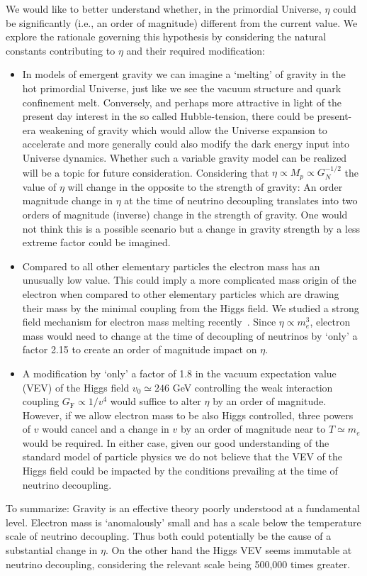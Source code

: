 We would like to better understand whether, in the primordial Universe, $\eta$ could be significantly (i.e., an order
of magnitude) different from the current value. We explore the rationale governing this
hypothesis by considering the natural constants  contributing to $\eta$ and their required
modification:
\begin{itemize}
\item
In models of emergent gravity we can imagine a `melting' of gravity in the hot primordial
Universe, just like we see the vacuum structure and quark confinement melt. Conversely, and
perhaps more attractive in light of the present day interest in the so called Hubble-tension, there could be
present-era weakening of gravity which would allow the Universe expansion to accelerate and more
generally could also modify the dark energy input into Universe dynamics. Whether such a
variable gravity model can be realized will be a topic for future consideration. Considering
that  $\eta\propto M_p\propto G_N^{-1/2}$ the value of $\eta$ will change in the opposite to the
strength of gravity: An order magnitude change in $\eta$ at the time of neutrino decoupling
translates into two orders of magnitude (inverse) change in the strength of gravity. One would
not think this is a possible scenario but a change in gravity strength by a less extreme factor
could be imagined.
\item
Compared to all other elementary particles the electron mass has an unusually low value. This
could imply a more complicated mass origin of the electron when compared to other elementary
particles which are drawing their mass by the minimal coupling from the Higgs field.  We studied
  a strong field mechanism for electron mass melting recently~\cite{Evans:2019zyk}. Since
$\eta\propto m_e^3$, electron mass would need to change at the time of decoupling of neutrinos by
`only' a factor 2.15 to create an order of magnitude impact on $\eta$.
\item
A modification by `only' a factor of 1.8  in the vacuum  expectation value (VEV) of the Higgs field
$v_0\simeq 246$ GeV  controlling the weak interaction coupling $G_\mathrm{F}\propto 1/v^4$ would
suffice to alter $\eta$ by an order of magnitude. However, if we allow electron mass to be also
Higgs controlled,  three powers of $v$ would cancel and a change in $v$ by an order of magnitude
near to $T\simeq m_e$ would be required. In either case, given our good understanding of the
standard model of particle physics  we do not believe that the  VEV of the Higgs field could be
impacted by the conditions prevailing at the time of neutrino decoupling.
\end{itemize}
To summarize: Gravity is an effective theory poorly understood at a fundamental level. Electron
mass is `anomalously' small and has a scale below the temperature scale of neutrino decoupling.
Thus both could potentially  be the cause of a substantial change in $\eta$. On the other hand the Higgs VEV seems
immutable at neutrino decoupling, considering the relevant scale being 500,000 times greater.

